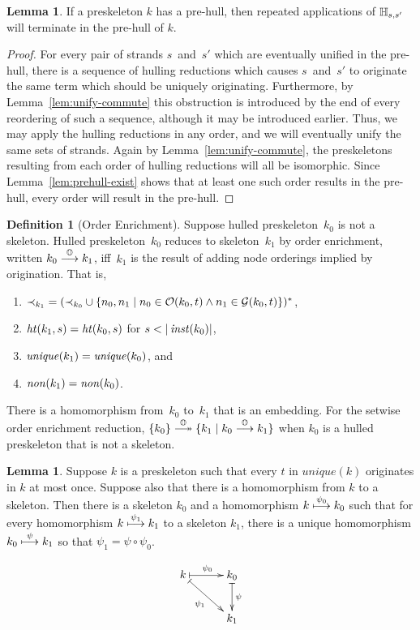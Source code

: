 \documentclass[12pt]{article}
\theoremstyle{definition}
\newtheorem{defn}{Definition}[section]
\newtheorem{lem}[thm]{Lemma}
\begin{document}
\begin{lem}\label{lem:prehull-compute}
If a preskeleton $k$ has a pre-hull, then repeated applications
of $\mathbb H_{s,s'}$ will terminate in the pre-hull of $k$.
\end{lem}

\begin{proof}
For every pair of strands $s$~and~$s'$ which are eventually unified
in the pre-hull, there is a sequence of hulling reductions which
causes $s$~and~$s'$ to originate the same term which should
be uniquely originating.  Furthermore, by Lemma~\ref{lem:unify-commute}
this obstruction is introduced by the end of every reordering of such
a sequence, although it may be introduced earlier.  Thus, we may apply
the hulling reductions in any order, and we will eventually unify the
same sets of strands.  Again by Lemma~\ref{lem:unify-commute},
the preskeletons resulting from each order of hulling reductions will
all be isomorphic.  Since Lemma~\ref{lem:prehull-exist} shows that
at least one such order results in the pre-hull, every order will
result in the pre-hull.
\end{proof}

\begin{defn}[Order Enrichment]
Suppose hulled preskeleton~$k_0$ is not a skeleton.  Hulled
preskeleton~$k_0$ reduces to skeleton~$k_1$ by order enrichment, written
$k_0\stackrel{\mathbb O}{\longrightarrow}k_1$, iff~$k_1$ is the result of adding node
orderings implied by origination.  That is,
\begin{enumerate}
\item $\mathbin{\prec_{k_1}}= (\mathbin{\prec_{k_0}}\cup\{n_0,n_1\mid n_0\in\mathcal{O}(k_0,t)\land
n_1\in\mathcal{G}(k_0,t)\})^\ast$,
\item $\operatorname{\mathit{ht}}(k_1,s)=
\operatorname{\mathit{ht}}(k_0,s)$ for $s<|\fn{inst}(k_0)|$,
\item $\operatorname{\mathit{unique}}(k_1)=\operatorname{\mathit{unique}}(k_0)$, and
\item $\operatorname{\mathit{non}}(k_1)=\operatorname{\mathit{non}}(k_0)$.
\end{enumerate}
There is a homomorphism from~$k_0$ to~$k_1$ that is an embedding.  For
the setwise order enrichment reduction,
$\{k_0\}\setreduction{\ops{O}}\{k_1\mid k_0\reduction{\ops{O}}k_1\}$
when $k_0$ is a hulled preskeleton that is not a skeleton.
\end{defn}

\begin{lem}\label{lem:order-enrichment}
Suppose $k$ is a preskeleton such that every $t$ in $unique(k)$ originates
in $k$ at most once.  Suppose also that there is a homomorphism from
$k$ to a skeleton.  Then there is a skeleton $k_0$ and a homomorphism
$k\stackrel{\psi_0}{\longmapsto}k_0$ such that for every homomorphism
$k\stackrel{\psi_1}{\longmapsto}k_1$ to a skeleton $k_1$, there is a unique
homomorphism $k_0\stackrel{\psi}{\longmapsto}k_1$ so that $\psi_1=\psi\circ\psi_0$.

$$\xymatrix@C=3em{
k\ar@{|->}[r]^{\psi_0} \ar@{|->}[rd]_{\psi_1} &
k_0 \ar@{|->}[d]^{\psi}\\
&k_1}$$
\end{lem}
\end{document}

